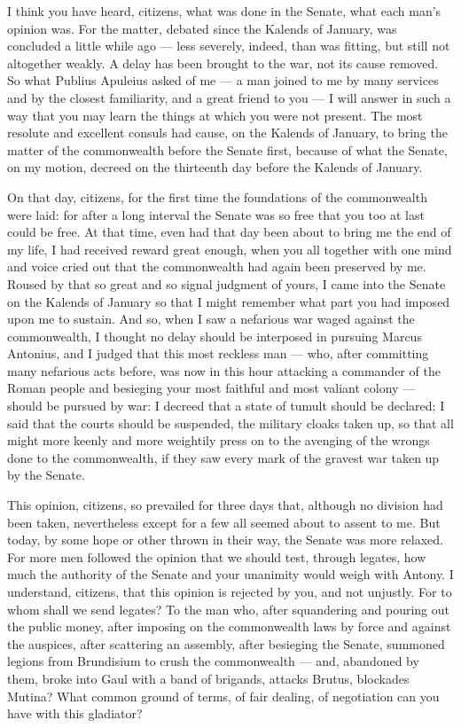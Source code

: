 
 I think you have heard, citizens, what was done in the Senate, what each man's opinion was. For the matter, debated since the Kalends of January, was concluded a little while ago --- less severely, indeed, than was fitting, but still not altogether weakly. A delay has been brought to the war, not its cause removed. So what Publius Apuleius asked of me --- a man joined to me by many services and by the closest familiarity, and a great friend to you --- I will answer in such a way that you may learn the things at which you were not present. The most resolute and excellent consuls had cause, on the Kalends of January, to bring the matter of the commonwealth before the Senate first, because of what the Senate, on my motion, decreed on the thirteenth day before the Kalends of January.

 On that day, citizens, for the first time the foundations of the commonwealth were laid: for after a long interval the Senate was so free that you too at last could be free. At that time, even had that day been about to bring me the end of my life, I had received reward great enough, when you all together with one mind and voice cried out that the commonwealth had again been preserved by me. Roused by that so great and so signal judgment of yours, I came into the Senate on the Kalends of January so that I might remember what part you had imposed upon me to sustain. And so, when I saw a nefarious war waged against the commonwealth, I thought no delay should be interposed in pursuing Marcus Antonius, and I judged that this most reckless man --- who, after committing many nefarious acts before, was now in this hour attacking a commander of the Roman people and besieging your most faithful and most valiant colony --- should be pursued by war: I decreed that a state of tumult should be declared; I said that the courts should be suspended, the military cloaks taken up, so that all might more keenly and more weightily press on to the avenging of the wrongs done to the commonwealth, if they saw every mark of the gravest war taken up by the Senate.

 This opinion, citizens, so prevailed for three days that, although no division had been taken, nevertheless except for a few all seemed about to assent to me. But today, by some hope or other thrown in their way, the Senate was more relaxed. For more men followed the opinion that we should test, through legates, how much the authority of the Senate and your unanimity would weigh with Antony. I understand, citizens, that this opinion is rejected by you, and not unjustly. For to whom shall we send legates? To the man who, after squandering and pouring out the public money, after imposing on the commonwealth laws by force and against the auspices, after scattering an assembly, after besieging the Senate, summoned legions from Brundisium to crush the commonwealth --- and, abandoned by them, broke into Gaul with a band of brigands, attacks Brutus, blockades Mutina? What common ground of terms, of fair dealing, of negotiation can you have with this gladiator?

